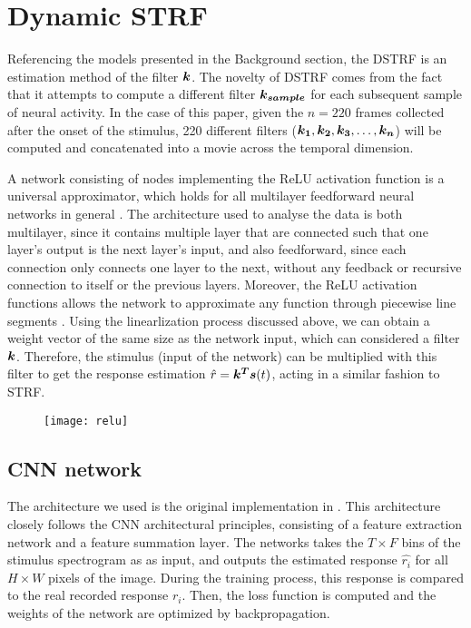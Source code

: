 
\section{Dynamic STRF}
Referencing the models presented in the Background section, the DSTRF is an estimation method of the filter $\bm{k}$. The novelty of DSTRF comes from the fact that it attempts to compute a different filter $\bm{k_{sample}}$ for each subsequent sample of neural activity. In the case of this paper, given the $n = 220$ frames collected after the onset of the stimulus, 220 different filters ($\bm{k_1}, \bm{k_2}, \bm{k_3}, \dots, \bm{k_n}$) will be computed and concatenated into a movie across the temporal dimension. 

A network consisting of nodes implementing the ReLU activation function is a universal approximator, which holds for all multilayer feedforward neural networks in general \parencite{hornikMultilayerFeedforwardNetworks1989}. The architecture used to analyse the data is both multilayer, since it contains multiple layer that are connected such that one layer's output is the next layer's input, and also feedforward, since each connection only connects one layer to the next, without any feedback or recursive connection to itself or the previous layers. Moreover, the ReLU activation functions allows the network to approximate any function through piecewise line segments \parencite{keshishianEstimatingInterpretingNonlinear2020}. Using the linearlization process discussed above, we can obtain a weight vector of the same size as the network input, which can considered a filter $\bm{k}$. Therefore, the stimulus (input of the network) can be multiplied with this filter to get the response estimation $\hat{r} = \bm{k^T}\bm{s}(t)$, acting in a similar fashion to STRF.

\begin{figure}[ht]
	\centering
	\texttt{[image: relu]}
	\caption{\parencite{keshishianEstimatingInterpretingNonlinear2020}}
\end{figure}

\subsection{CNN network}
The architecture we used is the original implementation in \parencite{keshishianEstimatingInterpretingNonlinear2020}. This architecture closely follows the CNN architectural principles, consisting of a feature extraction network and a feature summation layer. The networks takes the $T \times F$ bins of the stimulus spectrogram as as input, and outputs the estimated response $\hat{r_i}$ for all $H \times W$ pixels of the image. During the training process, this response is compared to the real recorded response $r_i$. Then, the loss function is computed and the weights of the network are optimized by backpropagation.

